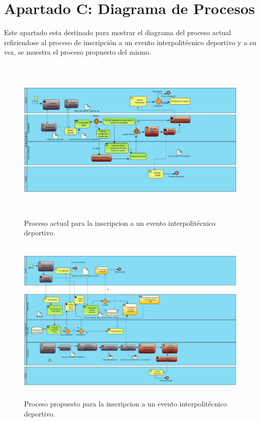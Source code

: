	\chapter{Apartado C: Diagrama de Procesos}	
		\noindent Este apartado esta destinado para mostrar el diagrama del proceso actual refiriendose al proceso de inscripción a un evento interpolitécnico deportivo y a su vez, se muestra el proceso propuesto del mismo.
		
		\begin{figure}[hbt!]
			\centering
			\includegraphics[width=16cm, height=8cm]{Imagenes/Disenos/ProcesoInscripcionActual.jpg}
			\caption{Proceso actual para la inscripcion a un evento interpolitécnico deportivo.}
			\label{ProcesoInscripcionActual}
		\end{figure}
	\pagebreak
	
		\begin{figure}[hbt!]
			\centering
			\includegraphics[width=16cm, height=8cm]{Imagenes/Disenos/ProcesoInscripcionPropuesto.jpg}
			\caption{Proceso propuesto para la inscripcion a un evento interpolitécnico deportivo.}
			\label{ProcesoInscripcionPropuesto}
		\end{figure}
	

